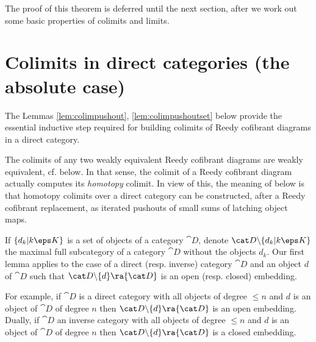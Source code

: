 The proof of this theorem is deferred until the next section, after we work out some basic properties of colimits and limits. 

\section{Colimits in direct categories (the absolute case)}
\label{sec:colimdirectabsolute}

The Lemmas \ref{lem:colimpushout}, \ref{lem:colimpushoutset} below provide the essential inductive step required for building colimits of Reedy cofibrant diagrams in a direct category. 

The colimits of any two weakly equivalent Reedy cofibrant diagrams are weakly equivalent, cf.  below. In that sense, the colimit of a Reedy cofibrant diagram actually computes its {\it homotopy} colimit. In view of this, the meaning of  below is that homotopy colimits over a direct category can be constructed, after a Reedy cofibrant replacement, as iterated pushouts of small sums of latching object maps.

If $\{d_k | k \eps K\}$ is a set of objects of a category ${\cat D}$, denote ${\cat D} \backslash \{d_k | k \eps K \}$ the maximal full subcategory of a category ${\cat D}$ without the objects $d_k$. Our first lemma applies to the case of a direct (resp. inverse) category ${\cat D}$ and an object $d$ of ${\cat D}$ such that ${\cat D} \backslash \{d\} \ra {\cat D}$ is an open (resp. closed) embedding.

For example, if ${\cat D}$ is a direct category with all objects of degree $\leq n$ and $d$ is an object of ${\cat D}$ of degree $n$ then ${\cat D} \backslash \{d\} \ra {\cat D}$ is an open embedding. Dually, if ${\cat D}$ an inverse category with all objects of degree $\leq n$ and $d$ is an object of ${\cat D}$ of degree $n$ then ${\cat D} \backslash \{d\} \ra {\cat D}$ is a closed embedding.

